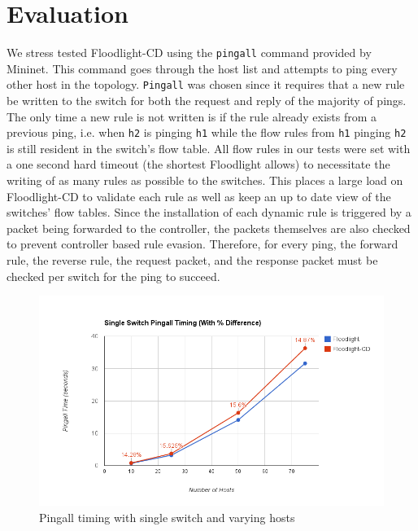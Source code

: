 \section{Evaluation}
\label{sec:evaluation}

We stress tested Floodlight-CD using the \texttt{pingall} command provided by Mininet.
This command goes through the host list and attempts to ping every other host in the topology.
\texttt{Pingall} was chosen since it requires that a new rule be written to the switch for both the request and reply of the majority of pings.
The only time a new rule is not written is if the rule already exists from a previous ping, i.e. when \texttt{h2} is pinging \texttt{h1} while the flow rules from \texttt{h1} pinging \texttt{h2} is still resident in the switch's flow table.
All flow rules in our tests were set with a one second hard timeout (the shortest Floodlight allows) to necessitate the writing of as many rules as possible to the switches.
This places a large load on Floodlight-CD to validate each rule as well as keep an up to date view of the switches' flow tables.
Since the installation of each dynamic rule is triggered by a packet being forwarded to the controller, the packets themselves are also checked to prevent controller based rule evasion.
Therefore, for every ping, the forward rule, the reverse rule, the request packet, and the response packet must be checked per switch for the ping to succeed.

\begin{figure}[ht!]
	\begin{center}
		\includegraphics[scale=.5]{figs/singleSwitch_eval.png}
		\caption{Pingall timing with single switch and varying hosts}
		\label{fig:eval_single}
	\end{center}
\end{figure}

